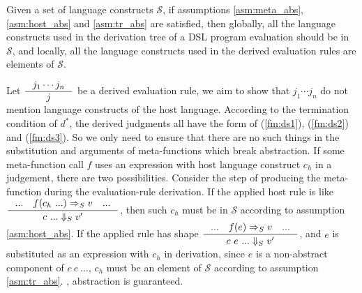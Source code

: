 

\begin{theorem}[Abstraction]
  Given a set of language constructs $\mathcal{S}$,
  if assumptions \ref{asm:meta_abs}, \ref{asm:host_abs} and \ref{asm:tr_abs} are satisfied,
  then globally, all the language constructs used in the derivation tree of a DSL program evaluation should be in $\mathcal{S}$, and locally, all the language constructs used in the derived evaluation rules are elements of $\mathcal{S}$.
\end{theorem}

Let $\inference{j_1\cdots j_n}{j}$ be a derived evaluation rule, 
we aim to show that $j_1\cdots j_n$ do not mention language constructs of the host language.
According to the termination condition of $d^{*}$, the derived judgments all have the form of (\ref{fm:ds1}), (\ref{fm:ds2}) and (\ref{fm:ds3}).
So we only need to ensure that there are no such things in the substitution and arguments of meta-functions which break abstraction.
If some meta-function call $f$ uses an expression with host language construct $c_h$ in a judgement,
there are two possibilities.
Consider the step of producing the meta-function  during the evaluation-rule derivation.
If the applied host rule is like $\inference{... \quad f(c_h~...)=>_S v \quad ...}{c~... \Da_S v'}$,
then such $c_h$ must be in $\mathcal{S}$ according to assumption \ref{asm:host_abs}.
If the applied rule has shape $\inference{... \quad f(e)=>_S v \quad ...}{c~e~... \Da_S v'}$,
and $e$ is substituted as an expression with $c_h$ in derivation, 
since $e$ is a non-abstract component of $c~e~...$, 
$c_h$ must be an element of $\mathcal{S}$ according to assumption \ref{asm:tr_abs}.
, abstraction is guaranteed.
